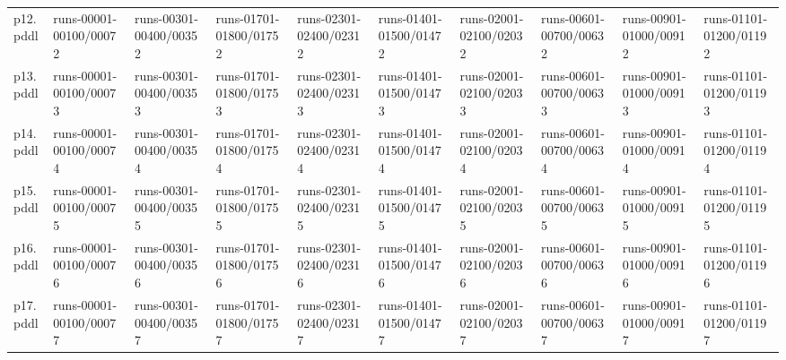 \documentclass{article}
\begin{document}
\begin{tabular}{@{}lrrrrrrrrr@{}}
p12.pddl & \multicolumn{1}{|l|}{runs-00001-00100/00072} & \multicolumn{1}{|l|}{runs-00301-00400/00352} & \multicolumn{1}{|l|}{runs-01701-01800/01752} & \multicolumn{1}{|l|}{runs-02301-02400/02312} & \multicolumn{1}{|l|}{runs-01401-01500/01472} & \multicolumn{1}{|l|}{runs-02001-02100/02032} & \multicolumn{1}{|l|}{runs-00601-00700/00632} & \multicolumn{1}{|l|}{runs-00901-01000/00912} & \multicolumn{1}{|l|}{runs-01101-01200/01192} \\
p13.pddl & \multicolumn{1}{|l|}{runs-00001-00100/00073} & \multicolumn{1}{|l|}{runs-00301-00400/00353} & \multicolumn{1}{|l|}{runs-01701-01800/01753} & \multicolumn{1}{|l|}{runs-02301-02400/02313} & \multicolumn{1}{|l|}{runs-01401-01500/01473} & \multicolumn{1}{|l|}{runs-02001-02100/02033} & \multicolumn{1}{|l|}{runs-00601-00700/00633} & \multicolumn{1}{|l|}{runs-00901-01000/00913} & \multicolumn{1}{|l|}{runs-01101-01200/01193} \\
p14.pddl & \multicolumn{1}{|l|}{runs-00001-00100/00074} & \multicolumn{1}{|l|}{runs-00301-00400/00354} & \multicolumn{1}{|l|}{runs-01701-01800/01754} & \multicolumn{1}{|l|}{runs-02301-02400/02314} & \multicolumn{1}{|l|}{runs-01401-01500/01474} & \multicolumn{1}{|l|}{runs-02001-02100/02034} & \multicolumn{1}{|l|}{runs-00601-00700/00634} & \multicolumn{1}{|l|}{runs-00901-01000/00914} & \multicolumn{1}{|l|}{runs-01101-01200/01194} \\
p15.pddl & \multicolumn{1}{|l|}{runs-00001-00100/00075} & \multicolumn{1}{|l|}{runs-00301-00400/00355} & \multicolumn{1}{|l|}{runs-01701-01800/01755} & \multicolumn{1}{|l|}{runs-02301-02400/02315} & \multicolumn{1}{|l|}{runs-01401-01500/01475} & \multicolumn{1}{|l|}{runs-02001-02100/02035} & \multicolumn{1}{|l|}{runs-00601-00700/00635} & \multicolumn{1}{|l|}{runs-00901-01000/00915} & \multicolumn{1}{|l|}{runs-01101-01200/01195} \\
p16.pddl & \multicolumn{1}{|l|}{runs-00001-00100/00076} & \multicolumn{1}{|l|}{runs-00301-00400/00356} & \multicolumn{1}{|l|}{runs-01701-01800/01756} & \multicolumn{1}{|l|}{runs-02301-02400/02316} & \multicolumn{1}{|l|}{runs-01401-01500/01476} & \multicolumn{1}{|l|}{runs-02001-02100/02036} & \multicolumn{1}{|l|}{runs-00601-00700/00636} & \multicolumn{1}{|l|}{runs-00901-01000/00916} & \multicolumn{1}{|l|}{runs-01101-01200/01196} \\
p17.pddl & \multicolumn{1}{|l|}{runs-00001-00100/00077} & \multicolumn{1}{|l|}{runs-00301-00400/00357} & \multicolumn{1}{|l|}{runs-01701-01800/01757} & \multicolumn{1}{|l|}{runs-02301-02400/02317} & \multicolumn{1}{|l|}{runs-01401-01500/01477} & \multicolumn{1}{|l|}{runs-02001-02100/02037} & \multicolumn{1}{|l|}{runs-00601-00700/00637} & \multicolumn{1}{|l|}{runs-00901-01000/00917} & \multicolumn{1}{|l|}{runs-01101-01200/01197} \\

\end{tabular}
\end{document}
